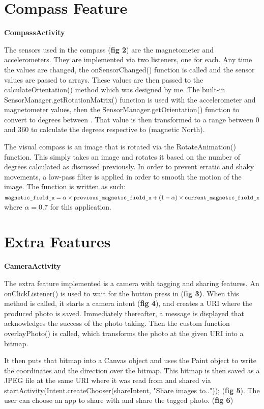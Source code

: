 \documentclass[12pt]{article}
\begin{document}
\section*{Compass Feature}

\textbf{CompassActivity}

The sensors used in the compass (\textbf{fig 2}) are the magnetometer and accelerometers. They are implemented via two listeners, one for each. Any time the values are changed, the onSensorChanged() function is called and the sensor values are passed to arrays. These values are then passed to the calculateOrientation() method which was designed by me. The built-in SensorManager.getRotationMatrix() function is used with the accelerometer and magnetometer values, then the SensorManager.getOrientation() function to convert to degrees between . That value is then transformed to a range between 0 and 360 to calculate the degrees respective to  (magnetic North).

The visual compass is an image that is rotated via the RotateAnimation() function. This simply takes an image and rotates it based on the number of degrees calculated as discussed previously. In order to prevent erratic and shaky movements, a low-pass filter is applied in order to smooth the motion of the image. The function is written as such: $ \verb!magnetic_field_x! = \alpha \times \verb!previous_magnetic_field_x! + (1 - \alpha) \times \verb!current_magnetic_field_x! $ where $\alpha = 0.7$ for this application.



\section*{Extra Features}

\textbf{CameraActivity}

The extra feature implemented is a camera with tagging and sharing features. An onClickListener() is used to wait for the button press in (\textbf{fig 3)}. When this method is called, it starts a camera intent (\textbf{fig 4}), and creates a URI where the produced photo is saved. Immediately thereafter, a message is displayed that acknowledges the success of the photo taking. Then the custom function overlayPhoto() is called, which transforms the photo at the given URI into a bitmap. 

It then puts that bitmap into a Canvas object and uses the Paint object to write the coordinates and the direction over the bitmap. This bitmap is then saved as a JPEG file at the same URI where it was read from and shared via startActivity(Intent.createChooser(shareIntent, "Share images to..")); (\textbf{fig 5}). The user can choose an app to share with and share the tagged photo. (\textbf{fig 6}) 
\end{document}
